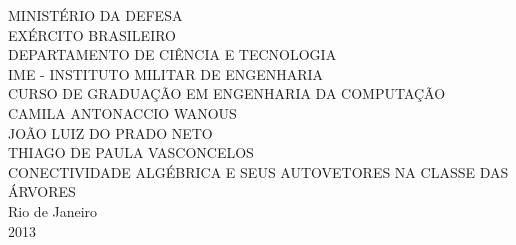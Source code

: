 \documentclass[a4paper,12pt]{imethesis}
\begin{document}
\begin{titlepage}

\begin{center}
\large{MINISTÉRIO DA DEFESA} \\
\large{EXÉRCITO BRASILEIRO} \\
\large{DEPARTAMENTO DE CIÊNCIA E TECNOLOGIA}\\
\large{IME - INSTITUTO MILITAR DE ENGENHARIA} \\
\large{CURSO DE GRADUAÇÃO EM ENGENHARIA DA COMPUTAÇÃO} \\
\vspace{5 cm}
\large{CAMILA ANTONACCIO WANOUS} \\
\large{JOÃO LUIZ DO PRADO NETO} \\
\large{THIAGO DE PAULA VASCONCELOS} \\
\vspace{5 cm}
\large{CONECTIVIDADE ALGÉBRICA E SEUS AUTOVETORES NA CLASSE DAS ÁRVORES}\\
\vspace{5 cm}
Rio de Janeiro\\
2013
\end{center}

\end{titlepage}







%









\newpage
$~$
\\




%
\end{document}
